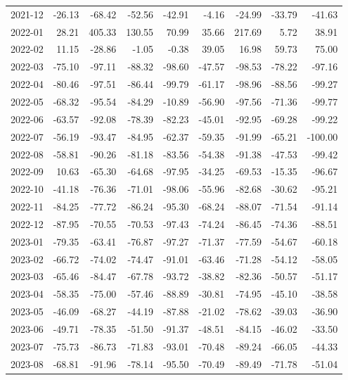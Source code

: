 \begin{table}[ht]
\begin{tabular}{lrrrrrrrr}
  2021-12 & -26.13 & -68.42 & -52.56 & -42.91 & -4.16 & -24.99 & -33.79 & -41.63 \\ 
  2022-01 & 28.21 & 405.33 & 130.55 & 70.99 & 35.66 & 217.69 & 5.72 & 38.91 \\ 
  2022-02 & 11.15 & -28.86 & -1.05 & -0.38 & 39.05 & 16.98 & 59.73 & 75.00 \\ 
  2022-03 & -75.10 & -97.11 & -88.32 & -98.60 & -47.57 & -98.53 & -78.22 & -97.16 \\ 
  2022-04 & -80.46 & -97.51 & -86.44 & -99.79 & -61.17 & -98.96 & -88.56 & -99.27 \\ 
  2022-05 & -68.32 & -95.54 & -84.29 & -10.89 & -56.90 & -97.56 & -71.36 & -99.77 \\ 
  2022-06 & -63.57 & -92.08 & -78.39 & -82.23 & -45.01 & -92.95 & -69.28 & -99.22 \\ 
  2022-07 & -56.19 & -93.47 & -84.95 & -62.37 & -59.35 & -91.99 & -65.21 & -100.00 \\ 
  2022-08 & -58.81 & -90.26 & -81.18 & -83.56 & -54.38 & -91.38 & -47.53 & -99.42 \\ 
  2022-09 & 10.63 & -65.30 & -64.68 & -97.95 & -34.25 & -69.53 & -15.35 & -96.67 \\ 
  2022-10 & -41.18 & -76.36 & -71.01 & -98.06 & -55.96 & -82.68 & -30.62 & -95.21 \\ 
  2022-11 & -84.25 & -77.72 & -86.24 & -95.30 & -68.24 & -88.07 & -71.54 & -91.14 \\ 
  2022-12 & -87.95 & -70.55 & -70.53 & -97.43 & -74.24 & -86.45 & -74.36 & -88.51 \\ 
  2023-01 & -79.35 & -63.41 & -76.87 & -97.27 & -71.37 & -77.59 & -54.67 & -60.18 \\ 
  2023-02 & -66.72 & -74.02 & -74.47 & -91.01 & -63.46 & -71.28 & -54.12 & -58.05 \\ 
  2023-03 & -65.46 & -84.47 & -67.78 & -93.72 & -38.82 & -82.36 & -50.57 & -51.17 \\ 
  2023-04 & -58.35 & -75.00 & -57.46 & -88.89 & -30.81 & -74.95 & -45.10 & -38.58 \\ 
  2023-05 & -46.09 & -68.27 & -44.19 & -87.88 & -21.02 & -78.62 & -39.03 & -36.90 \\ 
  2023-06 & -49.71 & -78.35 & -51.50 & -91.37 & -48.51 & -84.15 & -46.02 & -33.50 \\ 
  2023-07 & -75.73 & -86.73 & -71.83 & -93.01 & -70.48 & -89.24 & -66.05 & -44.33 \\ 
  2023-08 & -68.81 & -91.96 & -78.14 & -95.50 & -70.49 & -89.49 & -71.78 & -51.04 \\ 

\end{tabular}
\end{table}
